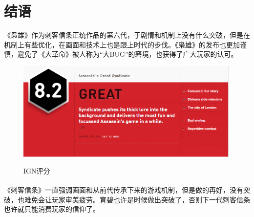 \documentclass{article} \usepackage{CJK}
\begin{document}
\section{结语}
\paragraph{}
《枭雄》作为刺客信条正统作品的第六代，于剧情和机制上没有什么突破，但是在机制上有些优化，在画面和技术上也是跟上时代的步伐。《枭雄》的发布也更加谨慎，避免了《大革命》被人称为“大BUG”的窘境，也获得了广大玩家的认可。
\begin{figure}[!h]
  \centering
  \includegraphics[width=30em]{IGN.png}\\
  \caption{IGN评分}\label{3-1}
\end{figure}
\paragraph{}
《刺客信条》一直强调画面和从前代传承下来的游戏机制，但是做的再好，没有突破，也难免会让玩家审美疲劳。育碧也许是时候做出突破了，否则下一代刺客信条也许就只能消费玩家的信仰了。
\end{document}
